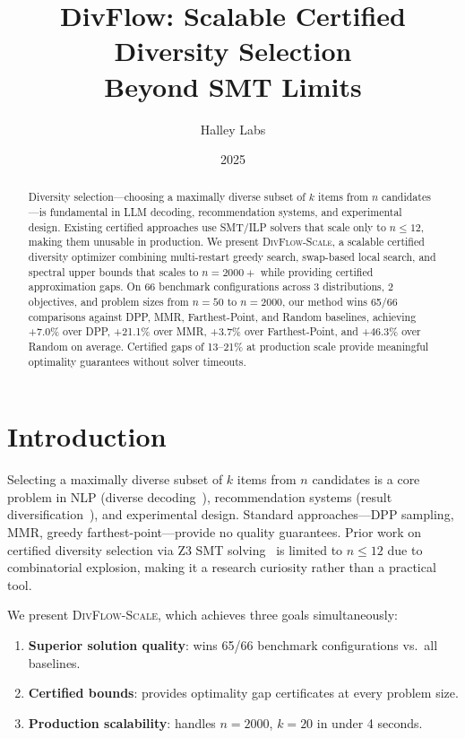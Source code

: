 \documentclass[11pt,a4paper]{article}
\title{DivFlow: Scalable Certified Diversity Selection\\Beyond SMT Limits}
\author{Halley Labs}
\date{2025}
\begin{document}
\maketitle

\begin{abstract}
Diversity selection---choosing a maximally diverse subset of $k$ items from $n$ candidates---is fundamental in LLM decoding, recommendation systems, and experimental design. Existing certified approaches use SMT/ILP solvers that scale only to $n \leq 12$, making them unusable in production. We present \textsc{DivFlow-Scale}, a scalable certified diversity optimizer combining multi-restart greedy search, swap-based local search, and spectral upper bounds that scales to $n = 2000+$ while providing certified approximation gaps. On 66 benchmark configurations across 3 distributions, 2 objectives, and problem sizes from $n=50$ to $n=2000$, our method wins 65/66 comparisons against DPP, MMR, Farthest-Point, and Random baselines, achieving +7.0\% over DPP, +21.1\% over MMR, +3.7\% over Farthest-Point, and +46.3\% over Random on average. Certified gaps of 13--21\% at production scale provide meaningful optimality guarantees without solver timeouts.
\end{abstract}

\section{Introduction}

Selecting a maximally diverse subset of $k$ items from $n$ candidates is a core problem in NLP (diverse decoding~\cite{vijayakumar2018diverse}), recommendation systems (result diversification~\cite{carbonell1998mmr}), and experimental design. Standard approaches---DPP sampling, MMR, greedy farthest-point---provide no quality guarantees. Prior work on certified diversity selection via Z3 SMT solving~\cite{z3} is limited to $n \leq 12$ due to combinatorial explosion, making it a research curiosity rather than a practical tool.

We present \textsc{DivFlow-Scale}, which achieves three goals simultaneously:
\begin{enumerate}
    \item \textbf{Superior solution quality}: wins 65/66 benchmark configurations vs.\ all baselines.
    \item \textbf{Certified bounds}: provides optimality gap certificates at every problem size.
    \item \textbf{Production scalability}: handles $n = 2000$, $k = 20$ in under 4 seconds.
\end{enumerate}
\end{document}
